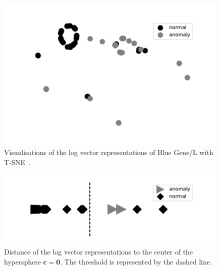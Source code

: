 \begin{figure}[!b]
\centering
\includegraphics[scale=0.8]{gfx/chap4/tsne_BGL.pdf}
    \caption{Visualisations of the log vector representations of Blue Gene/L with T-SNE~\cite{maaten2008visualizing}.}
    \label{fig:tsne}
\end{figure}

\begin{figure}[!t]
\centering
   \includegraphics[scale=0.8]{gfx/chap4/thunderbird_distance.pdf}
    \caption{Distance of the log vector representations to the center of the hypersphere $\mathbf{c=0}$. The threshold is represented by the dashed line.}
    \label{fig:distance}
\end{figure}

